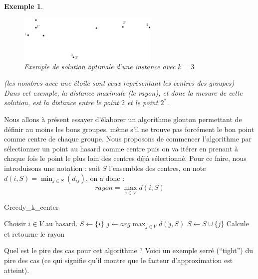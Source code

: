 \documentclass[12pt]{article}
\newtheorem{exemple}{Exemple}[section]
\begin{document}
\begin{exemple}$ $\\

\begin{figure}[h!]
    \begin{center}
    \includegraphics[width=0.6\textwidth]{inst_kcentre.pdf}
    \caption{Exemple de solution optimale d'une instance avec $k=3$}
    \end{center}
\end{figure}
\textit{(les nombres avec une étoile sont ceux représentant les centres des
groupes)}\\
Dans cet exemple, la distance maximale (le rayon), et donc la mesure de cette
solution, est la distance entre le point $2$ et le point $2^*$.
\end{exemple}

Nous allons à présent essayer d'élaborer un algorithme glouton permettant de
définir au moins les bons groupes, même s'il ne trouve pas forcément le bon
point comme centre de chaque groupe. Nous proposons de commencer l'algorithme
par sélectionner un point au hasard comme centre puis on va itérer en prenant
à chaque fois le point le plus loin des centres déjà sélectionné. Pour ce faire,
nous introduisons une notation : soit $S$ l'ensembles des centres, on note
$d(i,S) = \min_{j\in S}(d_{ij})$, on a donc : $$rayon = \max_{i\in V} d(i,S)$$

\begin{algorithm}[h!]
\caption{Greedy\_k\_center}
\begin{algorithmic}[1]
\STATE Choisir $i\in V$ au hasard.
\STATE $S\leftarrow \{i\}$
\STATE $j\leftarrow arg\max_{j\in V}d(j,S)$
\STATE $S\leftarrow S \cup \{j\}$
\ENDWHILE
\STATE Calcule et retourne le rayon
\end{algorithmic}
\end{algorithm}

Quel est le pire des cas pour cet algorithme ? Voici un exemple serré
(``tight'') du pire des cas (ce qui signifie qu'il montre que le
facteur d'approximation est atteint).
\end{document}
